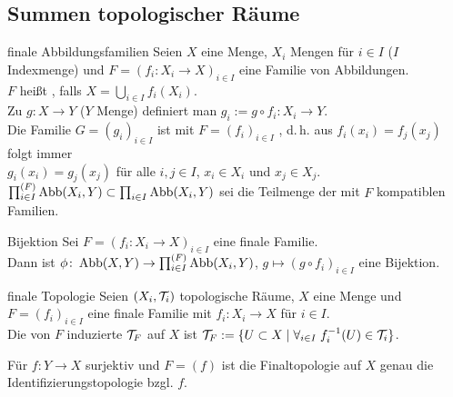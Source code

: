 \pagebreak

\subsection{%
    Summen topologischer Räume%
}

\begin{Def}{finale Abbildungsfamilien}
    Seien $X$ eine Menge, $X_i$ Mengen für $i \in I$ ($I$ Indexmenge)
    und $F = (f_i\colon X_i \rightarrow X)_{i \in I}$ eine Familie von
    Abbildungen. \\
    $F$ heißt , falls
    $X = \bigcup_{i \in I} f_i(X_i)$. \\
    Zu $g\colon X \rightarrow Y$ ($Y$ Menge) definiert man
    $g_i := g \circ f_i\colon X_i \rightarrow Y$. \\
    Die Familie $G = (g_i)_{i \in I}$ ist mit $F = (f_i)_{i \in I}$
    , d.\,h. aus $f_i(x_i) = f_j(x_j)$ folgt immer \\
    $g_i(x_i) = g_j(x_j)$ für alle $i, j \in I$, $x_i \in X_i$
    und $x_j \in X_j$. \\
    $\prod_{i \in I}^{(F)} \operatorname{Abb}(X_i, Y) \subset \prod_{i \in I} \operatorname{Abb}(X_i, Y)$
    sei die Teilmenge der mit $F$ kompatiblen Familien.
\end{Def}

\begin{Satz}{Bijektion}
    Sei $F = (f_i\colon X_i \rightarrow X)_{i \in I}$ eine finale Familie. \\
    Dann ist
    $\phi\colon \operatorname{Abb}(X, Y) \rightarrow \prod_{i \in I}^{(F)} \operatorname{Abb}(X_i, Y)$,
    $g \mapsto (g \circ f_i)_{i \in I}$ eine Bijektion.
\end{Satz}

\linie

\begin{Def}{finale Topologie}
    Seien $(X_i, \mathcal{T}_i)$ topologische Räume, $X$ eine Menge und
    $F = (f_i)_{i \in I}$ eine finale Familie mit
    $f_i\colon X_i \rightarrow X$ für $i \in I$. \\
    Die von $F$ induzierte  $\mathcal{T}_F$ auf $X$ ist
    $\mathcal{T}_F := \{U \subset X \;|\; \forall_{i \in I}\; f_i^{-1}(U) \in \mathcal{T}_i\}$.
\end{Def}

\begin{Bsp}
    Für $f\colon Y \rightarrow X$ surjektiv und $F = (f)$
    ist die Finaltopologie auf $X$
    genau die Identifizierungstopologie bzgl. $f$.
\end{Bsp}

